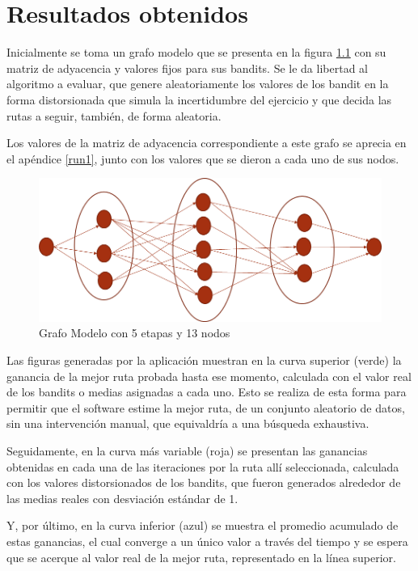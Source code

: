 \chapter{Resultados obtenidos}
\label{resul}
Inicialmente se toma un grafo modelo que se presenta en la figura \ref{Grafomodelo} con su matriz de adyacencia y valores fijos para sus bandits. Se le da libertad al algoritmo a evaluar, que genere aleatoriamente los valores de los bandit en la forma distorsionada que simula la incertidumbre del ejercicio y que decida las rutas a seguir, también, de forma aleatoria.

Los valores de la matriz de adyacencia correspondiente a este grafo se aprecia en el apéndice \ref{run1}, junto con los valores que se dieron a cada uno de sus nodos.

\begin{figure}[h]
  \centering
    \includegraphics[scale=0.5]{GrafoModelo.png}
  \caption[Grafo Modelo]{Grafo Modelo con 5 etapas y 13 nodos}
  \label{Grafomodelo}
\end{figure}

Las figuras generadas por la aplicación muestran en la curva superior (verde) la ganancia de la mejor ruta probada hasta ese momento, calculada con el valor real de los bandits o medias asignadas a cada uno. Esto se realiza de esta forma para permitir que el software estime la mejor ruta, de un conjunto aleatorio de datos, sin una intervención manual, que equivaldría a una búsqueda exhaustiva.

Seguidamente, en la curva más variable (roja) se presentan las ganancias obtenidas en cada una de las iteraciones por la ruta allí seleccionada, calculada con los valores distorsionados de los bandits, que fueron generados alrededor de las medias reales con desviación estándar de 1. 

Y, por último, en la curva inferior (azul) se muestra el promedio acumulado de estas ganancias, el cual converge a un único valor a través del tiempo y se espera que se acerque al valor real de la mejor ruta, representado en la línea superior.

